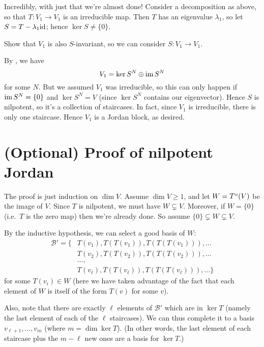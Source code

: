 Incredibly, with just that we're almost done!
Consider a decomposition as above, so that $T : V_1 \to V_1$ is an irreducible map.
Then $T$ has an eigenvalue $\lambda_1$, so let $S = T - \lambda_1 \mathrm{id}$; hence $\ker S \neq \{0\}$.
\begin{ques}
	Show that $V_1$ is also $S$-invariant, so we can consider $S : V_1 \to V_1$.
\end{ques}
By , we have
\[ V_1 = \ker S^N \oplus \operatorname{im} S^N \]
for some $N$.
But we assumed $V_1$ was irreducible, so this can only happen if $\operatorname{im} S^N = \{0\}$ and $\ker S^N = V$
(since $\ker S^N$ contains our eigenvector).
Hence $S$ is nilpotent, so it's a collection of staircases.
In fact, since $V_1$ is irreducible, there is only one staircase.
Hence $V_1$ is a Jordan block, as desired.

\section{(Optional) Proof of nilpotent Jordan}
The proof is just induction on $\dim V$.
Assume $\dim V \ge 1$, and let $W = T``(V)$ be the image of $V$.
Since $T$ is nilpotent, we must have $W \subsetneq V$.
Moreover, if $W = \{0\}$ (i.e.\ $T$ is the zero map) then we're already done.
So assume $\{0\} \subsetneq W \subsetneq V$.

By the inductive hypothesis, we can select a good basis of $W$:
\begin{align*}
	\mathcal B' =
	\Big\{ & T(v_1), T(T(v_1)), T(T(T(v_1))), \dots \\
	& T(v_2), T(T(v_2)), T(T(T(v_2))), \dots \\
	& \dots, \\
	& T(v_\ell), T(T(v_\ell)), T(T(T(v_\ell))), \dots \Big\}
\end{align*}
for some $T(v_i) \in W$ (here we have taken advantage of the fact that each element of $W$ is itself of the form $T(v)$ for some $v$).

Also, note that there are exactly $\ell$ elements of $\mathcal B'$ which are in $\ker T$
(namely the last element of each of the $\ell$ staircases).
We can thus complete it to a basis $v_{\ell+1}, \dots, v_m$ (where $m = \dim \ker T$).
(In other words, the last element of each staircase plus the $m-\ell$ new ones are a basis for $\ker T$.)

